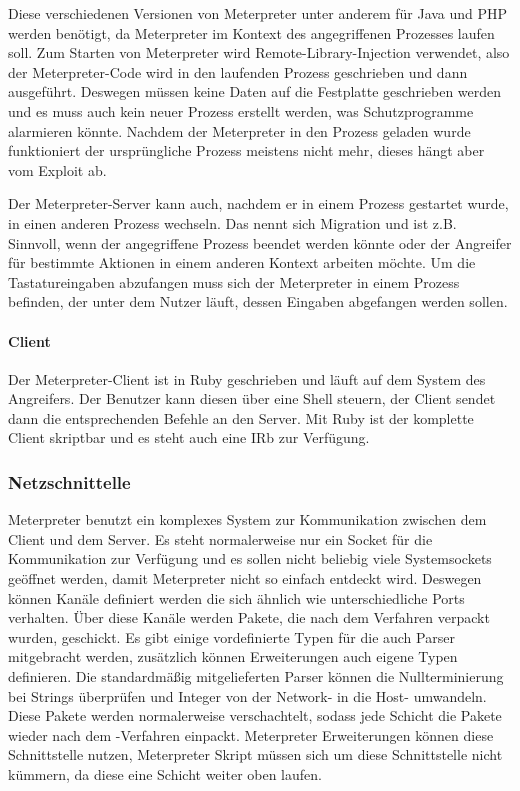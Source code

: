 Diese verschiedenen Versionen von Meterpreter unter anderem für Java und
PHP werden benötigt, da Meterpreter im Kontext des angegriffenen
Prozesses laufen soll. Zum Starten von Meterpreter wird
Remote-Library-Injection verwendet, also der Meterpreter-Code wird in
den laufenden Prozess geschrieben und dann ausgeführt. Deswegen müssen
keine Daten auf die Festplatte geschrieben werden und es muss auch kein
neuer Prozess erstellt werden, was Schutzprogramme alarmieren könnte.
Nachdem der Meterpreter in den Prozess geladen wurde funktioniert der
ursprüngliche Prozess meistens  nicht mehr, dieses hängt aber vom
Exploit ab.

Der Meterpreter-Server kann auch, nachdem er in einem Prozess gestartet
wurde, in einen anderen Prozess wechseln. Das nennt sich Migration und
ist z.B. Sinnvoll, wenn der angegriffene Prozess beendet werden könnte
oder der Angreifer für bestimmte Aktionen in einem anderen Kontext
arbeiten möchte. Um die Tastatureingaben abzufangen muss sich der
Meterpreter in einem Prozess befinden, der unter dem Nutzer läuft,
dessen Eingaben abgefangen werden sollen.

\paragraph{Client}

Der Meterpreter-Client ist in Ruby geschrieben und läuft auf dem System
des Angreifers. Der Benutzer kann diesen über eine Shell steuern, der
Client sendet dann die entsprechenden Befehle an den Server. Mit Ruby
ist der komplette Client skriptbar und es steht auch eine IRb zur
Verfügung.

\subsubsection{Netzschnittelle}

Meterpreter benutzt ein komplexes System zur Kommunikation zwischen dem
Client und dem Server. Es steht normalerweise nur ein Socket für die
Kommunikation zur Verfügung und es sollen nicht beliebig viele
Systemsockets geöffnet werden, damit Meterpreter nicht so einfach
entdeckt wird. Deswegen können Kanäle definiert werden die sich ähnlich
wie unterschiedliche Ports verhalten. Über diese Kanäle werden Pakete,
die nach dem  Verfahren verpackt wurden, geschickt. Es gibt
einige vordefinierte Typen für die auch Parser mitgebracht werden,
zusätzlich können Erweiterungen auch eigene Typen definieren. Die
standardmäßig mitgelieferten Parser können die Nullterminierung bei
Strings überprüfen und Integer von der Network- in die
Host- umwandeln. Diese Pakete werden normalerweise
verschachtelt, sodass jede Schicht die Pakete wieder nach dem
-Verfahren einpackt. Meterpreter Erweiterungen können diese
Schnittstelle nutzen, Meterpreter Skript müssen sich um diese
Schnittstelle nicht kümmern, da diese eine Schicht weiter oben laufen.


